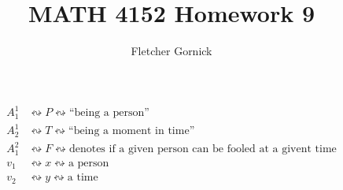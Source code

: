 \documentclass[11pt]{article}
\begin{document}
\title{\vspace{-1.5cm}MATH 4152 Homework 9}
  \author{Fletcher Gornick}
  \maketitle

  \begin{align*}
    A_1^1 &\leftrightsquigarrow P \leftrightsquigarrow \text{``being a person''} \\
    A_2^1 &\leftrightsquigarrow T \leftrightsquigarrow \text{``being a moment in time''} \\
    A_1^2 &\leftrightsquigarrow F \leftrightsquigarrow \text{denotes if a given person can be fooled at a givent time} \\
    v_1 &\leftrightsquigarrow x \leftrightsquigarrow \text{a person} \\
    v_2 &\leftrightsquigarrow y \leftrightsquigarrow \text{a time}
  \end{align*}
\end{document}
